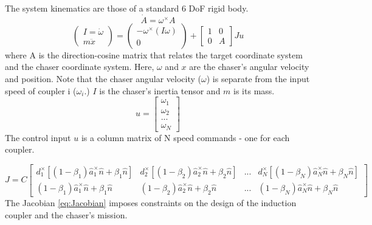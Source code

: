 
The system kinematics are those of a standard 6 DoF rigid body. 
\begin{equation}\label{eq:rotMrxPropigation}
\dot{A} = \omega^{\times}A
\end{equation}
\begin{equation}\label{eq:RigidBodyKinematics}
\begin{pmatrix} 
I =\dot{\omega} \\
m\ddot{x}
 \end{pmatrix}
=
\begin{pmatrix} 
-\omega^{ \times} \left( I\omega \right) \\
0
\end{pmatrix}
+
\begin{bmatrix}
1 & 0 \\
0 & A
\end{bmatrix}
Ju
\end{equation}
where A is the direction-cosine matrix that relates the target coordinate system and the chaser coordinate system. Here, $\omega$ and $x$ are the chaser's angular velocity and position. Note that the chaser angular velocity ($\omega$) is separate from the input speed of coupler i ($\omega_i$.)  $I$ is the chaser's inertia tensor and $m$ is its mass.
\begin{equation}
\label{eq:u_definition}
u = 
\begin{bmatrix}
\omega_1\\
\omega_2\\
...\\
\omega_N
\end{bmatrix}
\end{equation}
The control input $u$ is a column matrix of N speed commands - one for each coupler.

\begin{equation}\label{eq:Jacobian}
J = C\begin{bmatrix} 
d_1^{\times}\left[ \left(1-\beta_1 \right )\hat{a}_1^{\times}\hat{n} + \beta_1\hat{n}\right ]&
d_2^{\times}\left[\left(1-\beta_2 \right )\hat{a}_2^{\times}\hat{n} + \beta_2\hat{n}\right ] &
 ... &
d_N^{\times} \left[\left(1-\beta_N \right )\hat{a}_N^{\times}\hat{n} + \beta_N\hat{n}\right ]
\\

\left(1-\beta_1 \right )\hat{a}_1^{\times}\hat{n} + \beta_1\hat{n}&
\left(1-\beta_2 \right )\hat{a}_2^{\times}\hat{n} + \beta_2\hat{n} &
 ... &
 \left(1-\beta_N \right )\hat{a}_N^{\times}\hat{n} + \beta_N\hat{n}
\end{bmatrix}
\end{equation}
The Jacobian \ref{eq:Jacobian}  imposes constraints on the design of the induction coupler and the chaser's mission.

